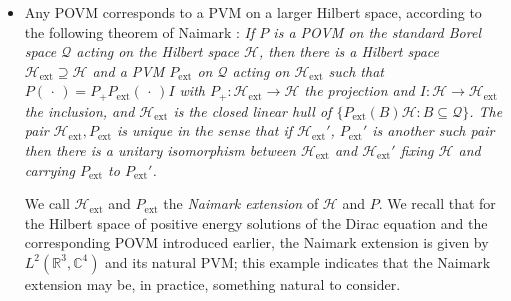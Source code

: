 \documentclass[12pt]{article}
\newcommand{\CCC}{\mathbb{C}} %
\newcommand{\RRR}{\mathbb{R}} %
\newcommand{\1}{\mathbf{1}} %
\newcommand{\Hilbert}{\mathscr{H}}
\newcommand{\conf}{\mathcal{Q}} %
\newcommand{\pov}{{P}}%
\newcommand{\ext}{{\mathrm{ext}}} %
\begin{document}
\begin{itemize}
\item Any POVM corresponds to a PVM on a larger Hilbert space,
   according to the following theorem of Naimark \cite[p.~142]{Davies}:
   \textit{If $\pov$ is a POVM on the standard Borel space $\conf$
   acting on the Hilbert space $\Hilbert$, then there is a Hilbert
   space $\Hilbert_\ext \supseteq \Hilbert$ and a PVM $\pov_\ext$ on
   $\conf$ acting on $\Hilbert_\ext$ such that $\pov(\,\cdot\,) = P_+
   \pov_\ext(\,\cdot\,) I$ with $P_+: \Hilbert_\ext \to \Hilbert$ the
   projection and $I:\Hilbert \to \Hilbert_\ext$ the inclusion, and
   $\Hilbert_\ext$ is the closed linear hull of $\{\pov_\ext(B)
   \Hilbert: B \subseteq \conf\}$. The pair $\Hilbert_\ext, \pov_\ext$
   is unique in the sense that if $\Hilbert_\ext'$, $\pov_\ext'$ is
   another such pair then there is a unitary isomorphism between
   $\Hilbert_\ext$ and $\Hilbert_\ext'$ fixing $\Hilbert$ and carrying
   $\pov_\ext$ to $\pov_\ext'$.}

   We call $\Hilbert_\ext$ and $\pov_\ext$ the \emph{Naimark extension}
   of $\Hilbert$ and $\pov$. We recall that for the Hilbert space of
   positive energy solutions of the Dirac equation and the
   corresponding POVM introduced earlier, the Naimark extension is
   given by $L^2(\RRR^3,\CCC^4)$ and its natural PVM; this example
   indicates that the Naimark extension may be, in practice, something
   natural to consider.


\end{itemize}
\end{document}
